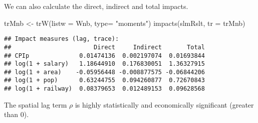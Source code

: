 \documentclass[
]{article}
\newenvironment{Shaded}{\begin{snugshade}}{\end{snugshade}}
\newcommand{\AttributeTok}[1]{\textcolor[rgb]{0.77,0.63,0.00}{#1}}
\newcommand{\CommentTok}[1]{\textcolor[rgb]{0.56,0.35,0.01}{\textit{#1}}}
\newcommand{\ConstantTok}[1]{\textcolor[rgb]{0.00,0.00,0.00}{#1}}
\newcommand{\DecValTok}[1]{\textcolor[rgb]{0.00,0.00,0.81}{#1}}
\newcommand{\FunctionTok}[1]{\textcolor[rgb]{0.00,0.00,0.00}{#1}}
\newcommand{\NormalTok}[1]{#1}
\newcommand{\OtherTok}[1]{\textcolor[rgb]{0.56,0.35,0.01}{#1}}
\newcommand{\SpecialCharTok}[1]{\textcolor[rgb]{0.00,0.00,0.00}{#1}}
\newcommand{\StringTok}[1]{\textcolor[rgb]{0.31,0.60,0.02}{#1}}
\begin{document}
We can also calculate the direct, indirect and total impacts.

\begin{Shaded}
\begin{Highlighting}[]
\NormalTok{trMnb }\OtherTok{\textless{}{-}} \FunctionTok{trW}\NormalTok{(}\AttributeTok{listw =}\NormalTok{ Wnb, }\AttributeTok{type=} \StringTok{"moments"}\NormalTok{)}
\FunctionTok{impacts}\NormalTok{(slmRslt, }\AttributeTok{tr =}\NormalTok{ trMnb)}
\end{Highlighting}
\end{Shaded}

\begin{verbatim}
## Impact measures (lag, trace):
##                       Direct     Indirect       Total
## CPIp              0.01474136  0.002197074  0.01693844
## log(1 + salary)   1.18644910  0.176830051  1.36327915
## log(1 + area)    -0.05956448 -0.008877575 -0.06844206
## log(1 + pop)      0.63244755  0.094260877  0.72670843
## log(1 + railway)  0.08379653  0.012489153  0.09628568
\end{verbatim}

The spatial lag term \(\rho\) is highly statistically and economically
significant (greater than \(0\)).

\begin{Shaded}
\end{Shaded}
\end{document}
